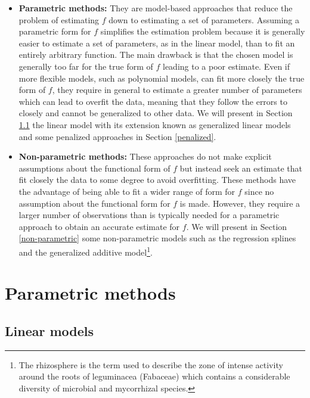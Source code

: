 \documentclass[]{book}
\let\rmarkdownfootnote\footnote%
\def\footnote{\protect\rmarkdownfootnote}
\begin{document}
\begin{itemize}
\item
  \textbf{Parametric methods:} They are model-based approaches that reduce
  the problem of estimating \(f\) down to estimating a set of
  parameters. Assuming a parametric form for \(f\) simplifies the
  estimation problem because it is generally easier to estimate a set
  of parameters, as in the linear model, than to fit an entirely
  arbitrary function. The main drawback is that the chosen model is
  generally too far for the true form of \(f\) leading to a poor
  estimate. Even if more flexible models, such as polynomial models,
  can fit more closely the true form of \(f\), they require in general
  to estimate a greater number of parameters which can lead to overfit
  the data, meaning that they follow the errors to closely and cannot
  be generalized to other data. We will present in Section
  \ref{linmod} the linear model with its extension known as
  generalized linear models and some penalized approaches in Section
  \ref{penalized}.
\item
  \textbf{Non-parametric methods:} These approaches do not make explicit
  assumptions about the functional form of \(f\) but instead seek an
  estimate that fit closely the data to some degree to avoid
  overfitting. These methods have the advantage of being able to fit a
  wider range of form for \(f\) since no assumption about the functional
  form for \(f\) is made. However, they require a larger number of
  observations than is typically needed for a parametric approach to
  obtain an accurate estimate for \(f\). We will present in Section
  \ref{non-parametric} some non-parametric models such as the
  regression splines and the generalized additive model\footnote{The rhizosphere is the term used to describe the zone of intense
    activity around the roots of leguminacea (Fabaceae) which contains a
    considerable diversity of microbial and mycorrhizal species.}.
\end{itemize}

\hypertarget{parametric}{%
\section{Parametric methods}\label{parametric}}

\hypertarget{linmod}{%
\subsection{Linear models}\label{linmod}}
\end{document}
